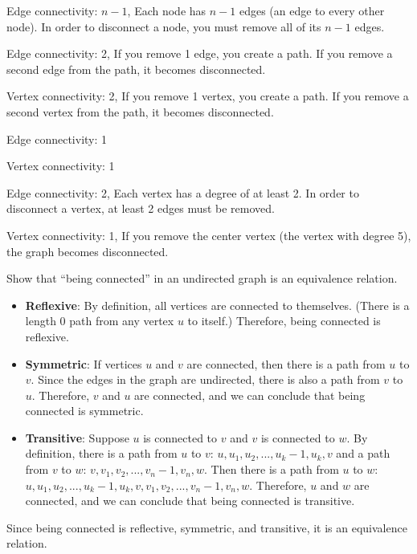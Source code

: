 \documentclass[solution, letterpaper]{cs20inclass}
\begin{document}
\begin{solution}
  \subsolution Edge connectivity: $n-1$, Each node has $n-1$ edges (an edge to every other node). In order to disconnect a node, you must remove all of its $n-1$ edges.

  \subsolution Edge connectivity: 2, If you remove 1 edge, you create a path. If you remove a second edge from the path, it becomes disconnected.

\noindent Vertex connectivity: 2, If you remove 1 vertex, you create a path. If you remove a second vertex from the path, it becomes disconnected.

  \subsolution Edge connectivity: 1

\noindent Vertex connectivity: 1

  \subsolution Edge connectivity: 2, Each vertex has a degree of at least 2. In order to disconnect a vertex, at least 2 edges must be removed.

\noindent Vertex connectivity: 1, If you remove the center vertex (the vertex with degree 5), the graph becomes disconnected.

\end{solution}

\problem
Show that ``being connected'' in an undirected graph is an equivalence relation.

\begin{solution}
\begin{itemize}

  \item \textbf{Reflexive}: By definition, all vertices are connected to themselves. (There is a length 0 path from any vertex $u$ to itself.) Therefore, being connected is reflexive.

  \item \textbf{Symmetric}: If vertices $u$ and $v$ are connected, then there is a path from $u$ to $v$. Since the edges in the graph are undirected, there is also a path from $v$ to $u$. Therefore, $v$ and $u$ are connected, and we can conclude that being connected is symmetric.

  \item \textbf{Transitive}: Suppose $u$ is connected to $v$ and $v$ is connected to $w$. By definition, there is a path from $u$ to $v$: $u, u_1, u_2,..., u_k-1, u_k, v$ and a path from $v$ to $w$: $v, v_1, v_2, ..., v_n-1, v_n, w$. Then there is a path from $u$ to $w$: $u, u_1, u_2,..., u_k-1, u_k, v, v_1, v_2, ..., v_n-1, v_n, w$. Therefore, $u$ and $w$ are connected, and we can conclude that being connected is transitive.

\end{itemize}

\noindent Since being connected is reflective, symmetric, and transitive, it is an equivalence relation.
\end{solution}
\end{document}
